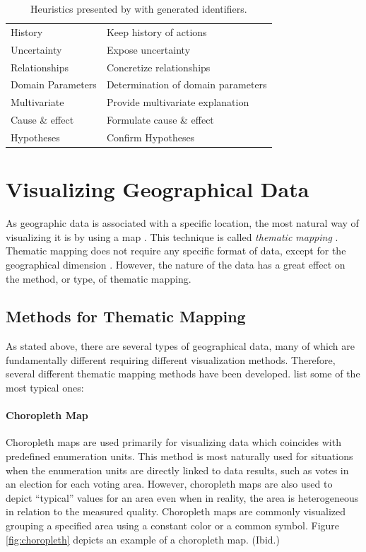 \begin{table}
\begin{tabular}{|p{4.2cm}|p{8.8cm}|}
History & Keep history of actions \\
Uncertainty & Expose uncertainty \\
Relationships & Concretize relationships \\
Domain Parameters & Determination of domain parameters \\
Multivariate & Provide multivariate explanation \\
Cause \& effect & Formulate cause \& effect \\
Hypotheses & Confirm Hypotheses \\
\hline
\end{tabular}
\caption{Heuristics presented by \citet{zuk_heuristics_2006} with generated identifiers.}
\label{table:heuristics}
\end{table}

\section{Visualizing Geographical Data}

As geographic data is associated with a specific location, the most natural way of visualizing it is by using a map \citep[chap.~1]{kraak_cartographic_1998,kraak_cartography_2011}. This technique is called \emph{thematic mapping} \citep[chap.~1]{slocum_thematic_2014}. Thematic mapping does not require any specific format of data, except for the geographical dimension \citep[chap.~1]{kraak_cartography_2011}. However, the nature of the data has a great effect on the method, or type, of thematic mapping.

\subsection{Methods for Thematic Mapping}
\label{subsection:mappingmethods}

As stated above, there are several types of geographical data, many of which are fundamentally different requiring different visualization methods. Therefore, several different thematic mapping methods have been developed. \citet[chap.~14-18]{slocum_thematic_2014} list some of the most typical ones:

\paragraph{Choropleth Map}

Choropleth maps are used primarily for visualizing data which coincides with predefined enumeration units. This method is most naturally used for situations when the enumeration units are directly linked to data results, such as votes in an election for each voting area. However, choropleth maps are also used to depict ``typical'' values for an area even when in reality, the area is heterogeneous in relation to the measured quality. Choropleth maps are commonly visualized grouping a specified area using a constant color or a common symbol. Figure \ref{fig:choropleth} depicts an example of a choropleth map. (Ibid.)

